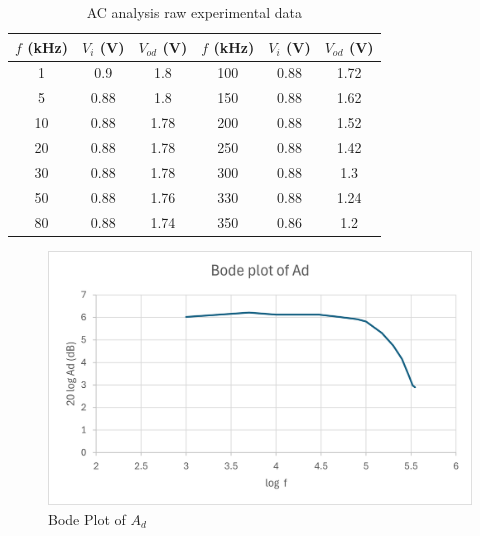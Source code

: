 \documentclass{article}
\begin{document}
\begin{CJK*}{UTF8}{bkai}
\begin{minipage}{0.5\textwidth}
\begin{table}[H]
    \begin{tabular}{|c|c|c||c|c|c|}
        \hline
        $f$ (\unit{\kilo\hertz}) &  $V_i$ (V)& $V_{od}$ (V) & $f$ (\unit{\kilo\hertz}) &  $V_i$ (V)& $V_{od}$ (V)\\
        \hline\hline
            1   & 0.9  & 1.8  & 100 & 0.88 & 1.72 \\
            5   & 0.88 & 1.8  & 150 & 0.88 & 1.62 \\
            10  & 0.88 & 1.78 & 200 & 0.88 & 1.52 \\
            20  & 0.88 & 1.78 & 250 & 0.88 & 1.42 \\
            30  & 0.88 & 1.78 & 300 & 0.88 & 1.3  \\
            50  & 0.88 & 1.76 & 330 & 0.88 & 1.24 \\
            80  & 0.88 & 1.74 & 350 & 0.86 & 1.2  \\
        \hline
    \end{tabular}
    \caption{AC analysis raw experimental data}
\end{table}
\end{minipage}\hspace{20mm}
\begin{minipage}{0.5\textwidth}
    \begin{figure}[H]   
        \includegraphics[scale=0.65]{Bode_plot_Ad.png}
        \caption{Bode Plot of $A_{d}$}
    \end{figure}
    \end{minipage}

\end{CJK*}
\end{document}
